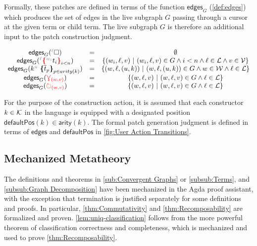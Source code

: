 Formally, these patches are defined in terms of the function $\mathsf{edges}_G$ (\autoref{def:edges}) which produces the set of edges in the live subgraph $G$ passing through a cursor at the given term or child term. The live subgraph $G$ is therefore an additional input to the patch construction judgment.

\begin{definition}
\label{def:edges}
    \[
    \begin{array}{ccc}
    \mathsf{edges}_G(\ehole) & = & \emptyset\\
    \mathsf{edges}_G(\conflict{\termMV}) & = & \SetOf{(w_i,\ell,v)\SuchThat{(w_i,\ell,v)\in G\land i<n\land \ell\in\L\land v\in\V}}\\
    \mathsf{edges}_G(\genericTerm{u}{\subtermMV_p}) & = & \SetOf{(w,\ell,(u,k))\SuchThat{(w,\ell,(u,k))\in G\land w\in\W\land \ell\in\L}}\\
    \mathsf{edges}_G(\multiref) & = & \SetOf{(w,\ell,v)\SuchThat{(w,\ell,v)\in G\land\ell\in\L}}\\
    \mathsf{edges}_G(\uniref) & = & \SetOf{(w,\ell,v)\SuchThat{(w,\ell,v)\in G\land\ell\in\L}}\\
    \end{array}
\]
\end{definition}

For the purpose of the construction action, it is assumed that each constructor $k\in\mathcal{K}$ in the language is equipped with a designated position $\mathsf{defaultPos}(k)\in \mathsf{arity}(k)$. The formal patch generation judgment is defined in terms of $\mathsf{edges}$ and $\mathsf{defaultPos}$ in \autoref{fig:User Action Transitions}.

\figureUserActionTransitions

\subsection{Mechanized Metatheory}

The definitions and theorems in \autoref{sub:Convergent Graphs} or \autoref{subsub:Terms}, and \autoref{subsub:Graph Decomposition} have been mechanized in the Agda proof assistant, with the exception that termination is justified separately for some definitions and proofs. In particular, \autoref{thm:Commutativity} and \autoref{thm:Recomposability} are formalized and proven. \autoref{lem:uniq-classification} follows from the more powerful theorem of classification correctness and completeness, which is mechanized and used to prove \autoref{thm:Recomposability}.


